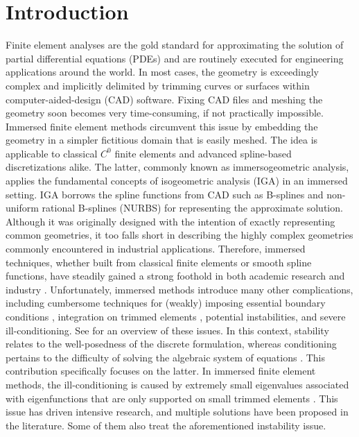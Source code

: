 \documentclass{article}
\numberwithin{equation}{section}
\theoremstyle{definition}
\begin{document}
\section{Introduction}
\label{se: introduction}
Finite element analyses are the gold standard for approximating the solution of partial differential equations (PDEs) and are routinely executed for engineering applications around the world. In most cases, the geometry is exceedingly complex and implicitly delimited by trimming curves or surfaces within computer-aided-design (CAD) software. Fixing CAD files and meshing the geometry soon becomes very time-consuming, if not practically impossible. Immersed finite element methods circumvent this issue by embedding the geometry in a simpler fictitious domain that is easily meshed. The idea is applicable to classical $C^0$ finite elements and advanced spline-based discretizations alike. The latter, commonly known as immersogeometric analysis, applies the fundamental concepts of isogeometric analysis (IGA) \cite{hughes2005isogeometric,cottrell2009isogeometric} in an immersed setting. IGA borrows the spline functions from CAD such as B-splines and non-uniform rational B-splines (NURBS) for representing the approximate solution. Although it was originally designed with the intention of exactly representing common geometries, it too falls short in describing the highly complex geometries commonly encountered in industrial applications. Therefore, immersed techniques, whether built from classical finite elements or smooth spline functions, have steadily gained a strong foothold in both academic research \cite{parvizian2007finite,schillinger2015finite} and industry \cite{messmer2022efficient,leidinger2019explicit}. Unfortunately, immersed methods introduce many other complications, including cumbersome techniques for (weakly) imposing essential boundary conditions \cite{de2018note}, integration on trimmed elements \cite{antolin2019isogeometric}, potential instabilities, and severe ill-conditioning. See \cite{de2023stability} for an overview of these issues. In this context, stability relates to the well-posedness of the discrete formulation, whereas conditioning pertains to the difficulty of solving the algebraic system of equations \cite{de2023stability}. This contribution specifically focuses on the latter. In immersed finite element methods, the ill-conditioning is caused by extremely small eigenvalues associated with eigenfunctions that are only supported on small trimmed elements \cite{de2017condition,de2019preconditioning,de2020multigrid,de2023stability}. This issue has driven intensive research, and multiple solutions have been proposed in the literature. Some of them also treat the aforementioned instability issue.
\end{document}
